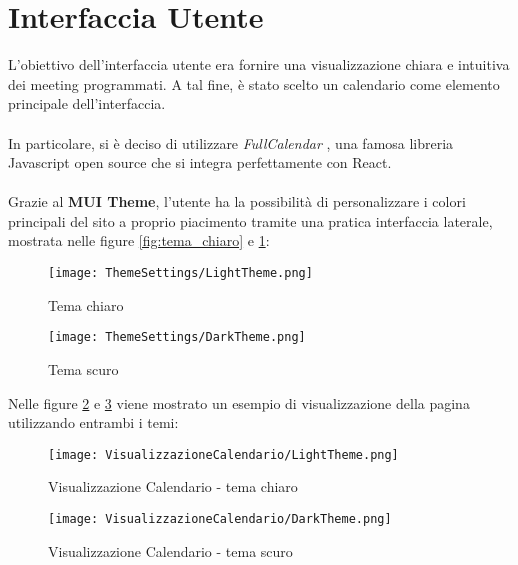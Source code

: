 \section{Interfaccia Utente}
L'obiettivo dell'interfaccia utente era fornire una visualizzazione chiara e intuitiva dei meeting programmati. 
A tal fine, è stato scelto un calendario come elemento principale dell'interfaccia.
\\\\
In particolare, si è deciso di utilizzare \textit{FullCalendar} \cite{FullCalendarSite},
una famosa libreria Javascript open source che si integra perfettamente con React.
\\\\
Grazie al \textbf{MUI Theme}, l'utente ha la possibilità di personalizzare i colori 
principali del sito a proprio piacimento tramite una pratica interfaccia laterale, mostrata nelle figure
\ref{fig:tema_chiaro} e \ref{fig:tema_scuro}:
\begin{figure}[H]
    \centering
    \begin{minipage}{0.45\textwidth}
        \centering
        \texttt{[image: ThemeSettings/LightTheme.png]}
        \caption{Tema chiaro}
        \label{fig:tema_chiaro}
    \end{minipage}
    \hspace{0.05\textwidth}
    \begin{minipage}{0.45\textwidth}
        \centering
        \texttt{[image: ThemeSettings/DarkTheme.png]}
        \caption{Tema scuro}
        \label{fig:tema_scuro}
    \end{minipage}
\end{figure}
\clearpage
\noindent Nelle figure \ref{fig:visualizzazioneCalendario} e \ref{fig:visualizzazioneCalendario_scuro} 
viene mostrato un esempio di visualizzazione della pagina utilizzando entrambi i temi:
\begin{figure}[H]   
    \centering
    \texttt{[image: VisualizzazioneCalendario/LightTheme.png]}
    \caption{Visualizzazione Calendario - tema chiaro}
    \label{fig:visualizzazioneCalendario}
\end{figure}
\begin{figure}[H]
    \centering
    \texttt{[image: VisualizzazioneCalendario/DarkTheme.png]}
    \caption{Visualizzazione Calendario - tema scuro}
    \label{fig:visualizzazioneCalendario_scuro}
\end{figure}
